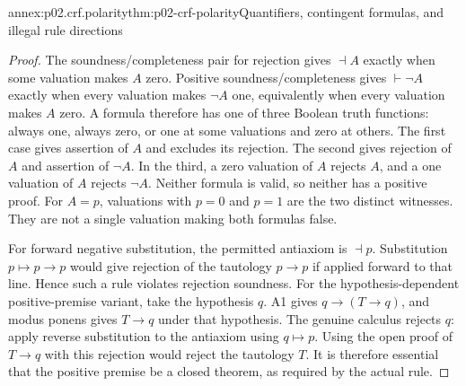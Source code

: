 \begin{annexitem}{annex:p02.crf.polarity}{thm:p02-crf-polarity}{Quantifiers, contingent formulas, and illegal rule directions}
\begin{proof}
The soundness/completeness pair for rejection gives
\(\dashv A\) exactly when some valuation makes \(A\) zero.
Positive soundness/completeness gives \(\vdash\neg A\)
exactly when every valuation makes \(\neg A\) one, equivalently
when every valuation makes \(A\) zero. A formula therefore has
one of three Boolean truth functions: always one, always zero, or
one at some valuations and zero at others. The first case gives
assertion of \(A\) and excludes its rejection. The second gives
rejection of \(A\) and assertion of \(\neg A\). In the third,
a zero valuation of \(A\) rejects \(A\), and a one valuation
of \(A\) rejects \(\neg A\). Neither formula is valid, so
neither has a positive proof. For \(A=p\), valuations with
\(p=0\) and \(p=1\) are the two distinct witnesses. They are
not a single valuation making both formulas false.

For forward negative substitution, the permitted antiaxiom is
\(\dashv p\). Substitution \(p\mapsto p\to p\) would give
rejection of the tautology \(p\to p\) if applied forward to
that line. Hence such a rule violates rejection soundness.
For the hypothesis-dependent positive-premise variant, take the
hypothesis \(q\). A1 gives \(q\to(T\to q)\), and modus
ponens gives \(T\to q\) under that hypothesis. The genuine
calculus rejects \(q\): apply reverse substitution to the
antiaxiom using \(q\mapsto p\). Using the open proof of
\(T\to q\) with this rejection would reject the tautology
\(T\). It is therefore essential that the positive premise
be a closed theorem, as required by the actual rule.
\end{proof}
\end{annexitem}

